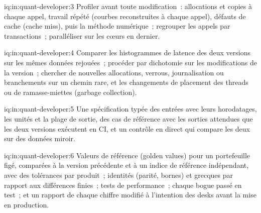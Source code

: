 \begin{solution}{iq:in:quant-developer:3}
Profiler avant toute modification~: allocations et copies à chaque appel, travail répété (courbes reconstruites à chaque appel), défauts de cache (cache miss),
puis la méthode numérique~; regrouper les appels par transactions~; paralléliser sur les cœurs en dernier.
\end{solution}

\begin{solution}{iq:in:quant-developer:4}
Comparer les histogrammes de latence des deux versions sur les mêmes données rejouées~; procéder par dichotomie sur les modifications de la version~; chercher de nouvelles
allocations, verrous, journalisation ou branchements sur un chemin rare, et les changements de placement des threads ou de ramasse-miettes (garbage collection).
\end{solution}

\begin{solution}{iq:in:quant-developer:5}
Une spécification typée des entrées avec leurs horodatages, les unités et la plage de sortie, des cas de référence avec les sorties attendues
que les deux versions exécutent en CI, et un contrôle en direct qui compare les deux sur des données miroir.
\end{solution}

\begin{solution}{iq:in:quant-developer:6}
Valeurs de référence (golden values) pour un portefeuille figé, comparées à la version précédente et à un indice de référence indépendant, avec des tolérances par produit~;
identités (parité, bornes) et grecques par rapport aux différences finies~; tests de performance~; chaque bogue passé en test~; et un
rapport de chaque chiffre modifié à l'intention des desks avant la mise en production.
\end{solution}
